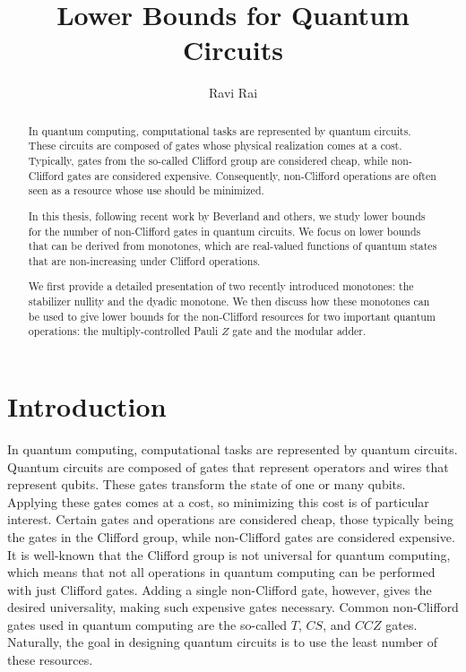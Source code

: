 \documentclass[12pt]{dalthesis}
\begin{document}
\title{Lower Bounds for Quantum Circuits}
\author{Ravi Rai}
\mcs
{}

\nolistoftables
\nolistoffigures

\frontmatter

\begin{abstract}
In quantum computing, computational tasks are represented by quantum circuits. These circuits are composed of gates whose physical realization comes at a cost. Typically, gates from the so-called Clifford group are considered cheap, while non-Clifford gates are considered expensive. Consequently, non-Clifford operations are often seen as a resource whose use should be minimized.

In this thesis, following recent work by Beverland and others, we study lower bounds for the number of non-Clifford gates in quantum circuits. We focus on lower bounds that can be derived from monotones, which are real-valued functions of quantum states that are non-increasing under Clifford operations.

We first provide a detailed presentation of two recently introduced monotones: the stabilizer nullity and the dyadic monotone. We then discuss how these monotones can be used to give lower bounds for the non-Clifford resources for two important quantum operations: the multiply-controlled Pauli $Z$ gate and the modular adder.
\end{abstract}



\mainmatter

\chapter{Introduction}

In quantum computing, computational tasks are represented by quantum circuits. Quantum circuits are composed of gates that represent operators and wires that represent qubits. These gates transform the state of one or many qubits. Applying these gates comes at a cost, so minimizing this cost is of particular interest. Certain gates and operations are considered cheap, those typically being the gates in the Clifford group, while non-Clifford gates are considered expensive. It is well-known that the Clifford group is not universal for quantum computing, which means that not all operations in quantum computing can be performed with just Clifford gates. Adding a single non-Clifford gate, however, gives the desired universality, making such expensive gates necessary. Common non-Clifford gates used in quantum computing are the so-called $T$, $CS$, and $CCZ$ gates. Naturally, the goal in designing quantum circuits is to use the least number of these resources.
\end{document}
